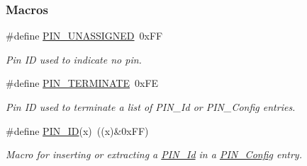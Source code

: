 \subsubsection*{Macros}
\begin{DoxyCompactItemize}
\item 
\#define \hyperlink{_p_i_n_8h_aba219226dfdc9ea2fb82d6a7995395bf}{P\+I\+N\+\_\+\+U\+N\+A\+S\+S\+I\+G\+N\+E\+D}~0x\+F\+F
\begin{DoxyCompactList}\small\item\em Pin I\+D used to indicate no pin. \end{DoxyCompactList}\item 
\#define \hyperlink{_p_i_n_8h_ae22ec44ad92ee130a665ca56aad38c75}{P\+I\+N\+\_\+\+T\+E\+R\+M\+I\+N\+A\+T\+E}~0x\+F\+E
\begin{DoxyCompactList}\small\item\em Pin I\+D used to terminate a list of P\+I\+N\+\_\+\+Id or P\+I\+N\+\_\+\+Config entries. \end{DoxyCompactList}\item 
\#define \hyperlink{_p_i_n_8h_add47c82f7563d28053f76d368d344bc6}{P\+I\+N\+\_\+\+I\+D}(x)~((x)\&0x\+F\+F)
\begin{DoxyCompactList}\small\item\em Macro for inserting or extracting a \hyperlink{_p_i_n_8h_a9ae8197f460bb76ea09a84f47d09921f}{P\+I\+N\+\_\+\+Id} in a \hyperlink{_p_i_n_8h_ae427b7d2925f9b0f3145e455cfdb5841}{P\+I\+N\+\_\+\+Config} entry. \end{DoxyCompactList}\end{DoxyCompactItemize}
